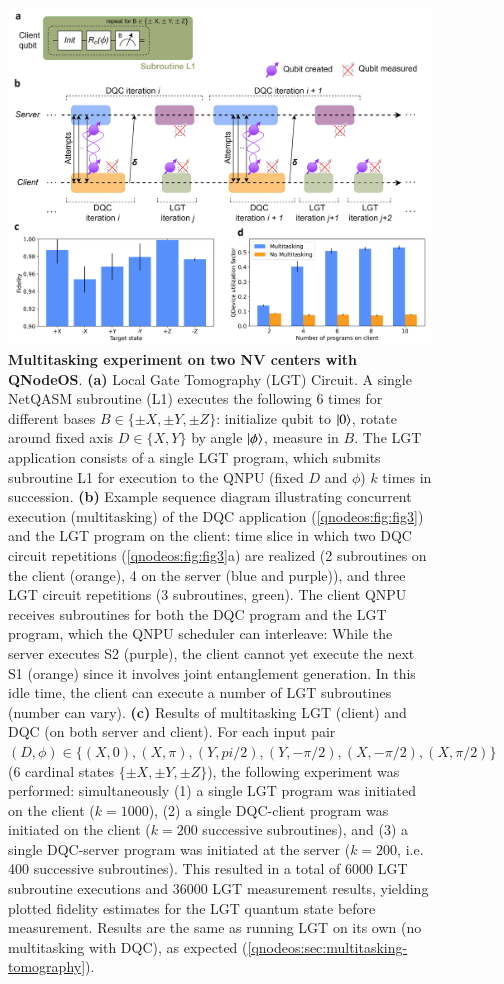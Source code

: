 \begin{figure}[t]
\centering
\includegraphics[width=1.0\textwidth]{figures/qnodeos/main/fig4/fig4.png}
\caption{\textbf{Multitasking experiment on two NV centers with QNodeOS}.
\textbf{(a)} Local Gate Tomography (LGT) Circuit. A single NetQASM subroutine (L1) executes the following 6 times for different bases $B \in \{\pm X, \pm Y, \pm Z\}$: initialize qubit to $\ket{0}$, rotate around fixed axis $D \in \{X,Y\}$ by angle $\ket{\phi}$, measure in $B$. The LGT application consists of a single LGT program, which submits subroutine L1 for execution to the QNPU (fixed $D$ and $\phi$) $k$ times in succession.
\textbf{(b)} Example sequence diagram illustrating concurrent execution (multitasking) of the DQC application (\cref{qnodeos:fig:fig3}) and the LGT program on the client: time slice in which two DQC circuit repetitions (\cref{qnodeos:fig:fig3}a) are realized (2 subroutines on the client (orange), 4 on the server (blue and purple)), and three LGT circuit repetitions (3 subroutines, green). The client QNPU receives subroutines for both the DQC program and the LGT program, which the QNPU scheduler can interleave: While the server executes S2 (purple), the client cannot yet execute the next S1 (orange) since it involves joint entanglement generation. In this idle time, the client can execute a number of LGT subroutines (number can vary).
\textbf{(c)} Results of multitasking LGT (client) and DQC (on both server and client). For each input pair $(D, \phi) \in \{ (X,0), (X,\pi), (Y,pi/2), (Y,-\pi/2), (X,-\pi/2), (X,\pi/2) \}$ (6 cardinal states $\{\pm X, \pm Y, \pm Z\}$), the following experiment was performed: simultaneously (1) a single LGT program was initiated on the client ($k=1000$), (2) a single DQC-client program was initiated on the client ($k=200$ successive subroutines), and (3) a single DQC-server program was initiated at the server ($k=200$, i.e. 400 successive subroutines). This resulted in a total of 6000 LGT subroutine executions and 36000 LGT measurement results, yielding plotted fidelity estimates for the LGT quantum state before measurement. Results are the same as running LGT on its own (no multitasking with DQC), as expected (\cref{qnodeos:sec:multitasking-tomography}).
}
\end{figure}
